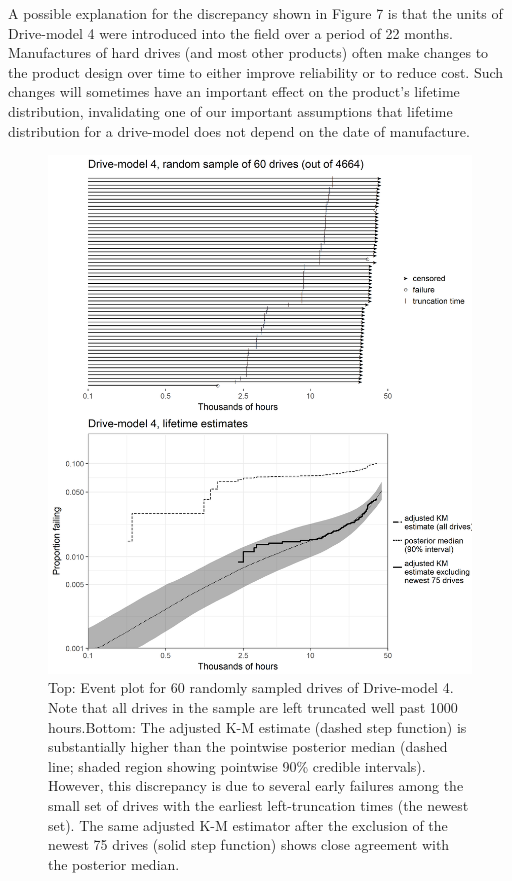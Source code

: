\documentclass[11pt]{article}
\begin{document}
A possible explanation for the discrepancy shown in Figure 7 is that
the units of Drive-model 4 were introduced into the field over a
period of 22 months. Manufactures of hard drives (and most other
products) often make changes to the product design over time to
either improve reliability or to reduce cost. Such changes will
sometimes have an important effect on the product's lifetime
distribution, invalidating one of our important assumptions that
lifetime distribution for a drive-model does not depend on the
date of manufacture. 

\begin{figure}
\centering
\includegraphics[height=.8\textheight]{dm4-exception.png}
\caption{\footnotesize Top: Event plot for 60 randomly sampled drives of Drive-model 4. Note that all drives in the sample are left truncated well past 1000 hours.\hspace{\textwidth}Bottom: The adjusted K-M estimate (dashed step function) is substantially higher than the pointwise posterior median (dashed line; shaded region showing pointwise 90\% credible intervals). However, this discrepancy is due to several early failures among the small set of drives with the earliest left-truncation times (the newest set). The same adjusted K-M estimator after the exclusion of the newest 75 drives (solid step function) shows close agreement with the posterior median.}

\label{fig:ex-mod-4}
\end{figure}
\end{document}
